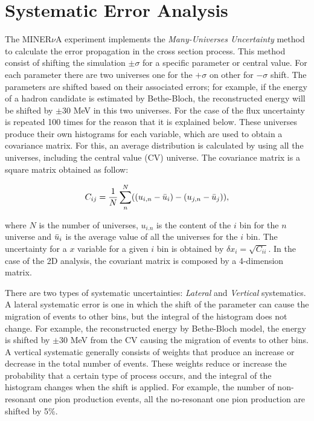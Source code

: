\chapter{Systematic Error Analysis}
\minitoc
\label{Cap:ErrorAnalysis}

The MINER$\nu$A experiment implements the \textit{Many-Universes Uncertainty} method to calculate the error propagation in the cross section process. This method consist of shifting the simulation $\pm\sigma$ for a specific parameter or central value. For each parameter there are two universes one for the $+\sigma$ on other for $-\sigma$ shift. The parameters are shifted based on their associated errors; for example, if the energy of a hadron candidate is estimated by Bethe-Bloch, the reconstructed energy will be shifted by $\pm30$ MeV in this two universes. For the case of the flux uncertainty is repeated 100 times for the reason that it is explained below. These universes produce their own histograms for each variable, which are used to obtain a covariance matrix. For this, an average distribution is calculated by using all the universes, including the central value (CV) universe. The covariance matrix is a square matrix obtained as follow:

\begin{equation}
    C_{ij}=\frac{1}{N}\sum^N_n((u_{i,n}-\Bar{u}_{i})-(u_{j,n}-\Bar{u}_{j})),
    \label{eq:Systematics:CovMatrix}
\end{equation}

where $N$ is the number of universes, $u_{i.n}$ is the content of the $i$ bin for the $n$ universe and $\Bar{u}_i$ is the average value of all the universes for the $i$ bin. The uncertainty for a $x$ variable for a  given $i$ bin is obtained by $\delta x_i=\sqrt{C_{ii}}$. In the case of the 2D analysis, the covariant matrix is composed by a 4-dimension matrix.

There are two types of systematic uncertainties: \textit{Lateral} and \textit{Vertical} systematics. A lateral systematic error is one in which the shift of the parameter can cause the migration of events to other bins, but the integral of the histogram does not change. For example, the reconstructed energy by Bethe-Bloch model, the energy is shifted by $\pm30$ MeV from the CV causing the migration of events to other bins. A vertical systematic generally consists of weights that produce an increase or decrease in the total number of events. These weights reduce or increase the probability that a certain type of process occurs, and the integral of the histogram changes when the shift is applied. For example, the number of non-resonant one pion production events, all the no-resonant one pion production are shifted by 5\%. 

